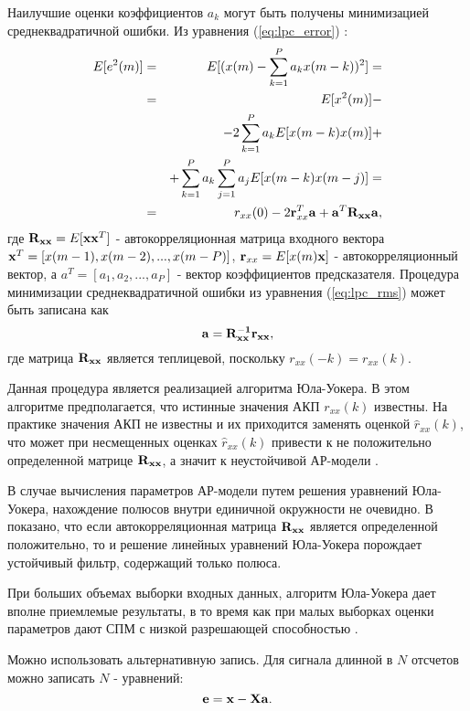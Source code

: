 Наилучшие оценки коэффициентов ${a_k}$ могут быть получены минимизацией среднеквадратичной ошибки. Из уравнения (\ref{eq:lpc_error}) \cite{saeed_book}:
\begin{eqnarray}
	\label{eq:lpc_rms}
		E[e^2(m)]	& = & E[(x(m) - \sum \limits_{k=1}^P a_k x(m-k))^2] =\nonumber \\
				& = & E[x^2(m)] - \nonumber \\
				& &  - 2\sum \limits_{k=1}^P a_k E[x(m-k)x(m)] + \nonumber \\
				& &  + \sum \limits_{k=1}^P a_k \sum \limits_{j=1}^P a_j E[x(m-k)x(m-j)] = \nonumber \\
				& = & r_{xx}(0) - 2{\bf r}^T_{xx}{\bf a} + {\bf a}^T {\bf R_{xx}a},
\end{eqnarray}
где ${{\bf R_{xx}} = E[{\bf xx}^T]}$ - автокорреляционная матрица входного \mbox{вектора ${{\bf x}^T=[x(m-1),x(m-2),...,x(m-P)]}$},
${{\bf r}_{xx}=E[x(m){\bf x}]}$ - автокорреляционный вектор, а ${a^T=[a_1,a_2,...,a_P]}$ -  вектор коэффициентов предсказателя.
Процедура минимизации среднеквадратичной ошибки из уравнения (\ref{eq:lpc_rms}) может быть записана как
\begin{equation}
	\label{eq:lpc_rms2}
	{\bf a=R^{-1}_{xx}r_{xx}},
\end{equation}
где матрица ${\bf R_{xx}}$ является теплицевой, поскольку  ${r_{xx}(-k) = r_{xx}(k)}$.

Данная процедура является реализацией алгоритма Юла-Уокера. В этом алгоритме предполагается, что истинные значения
АКП ${r_{xx}(k)}$ известны. На практике значения АКП не известны и их приходится заменять оценкой ${\hat{r}_{xx}(k)}$, что может
при несмещенных оценках ${\hat{r}_{xx}(k)}$ привести к не положительно определенной матрице ${\bf {R_{xx}}}$, а значит
к неустойчивой \mbox{АР-модели} \cite{bolshakov-book}.

В случае вычисления параметров АР-модели путем решения уравнений \mbox{Юла-Уокера}, нахождение полюсов
внутри единичной окружности не очевидно. В \cite{shahtarin-spectrum-book} показано, что если
автокорреляционная матрица  ${{\bf R_{xx}}}$ является определенной положительно, то и решение
линейных уравнений \mbox{Юла-Уокера} порождает устойчивый фильтр, содержащий только полюса.

При больших объемах выборки входных данных, алгоритм Юла-Уокера дает вполне приемлемые результаты, в то время
как при малых выборках оценки параметров дают СПМ с низкой разрешающей способностью \cite{marpl_book, bolshakov-book}.

Можно использовать альтернативную запись.  Для сигнала длинной в ${N}$ отсчетов можно записать ${N}$ - уравнений:
\begin{equation}
	\label{eq:lpc_rms3}
	{\bf e=x-Xa}.
\end{equation}

